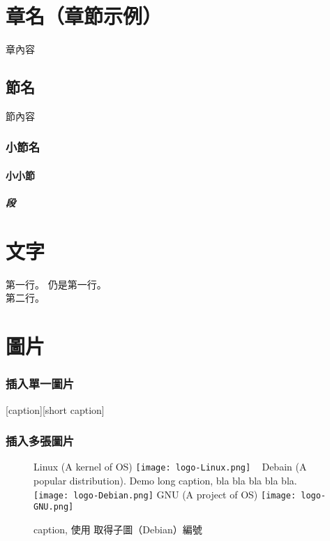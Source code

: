 \documentclass[class=NCU_thesis, crop=false]{standalone}
\begin{document}
\chapter{章名（章節示例）}
章內容
\section{節名}
節內容
\subsection{小節名}
 \subsubsection{小小節}
 \paragraph{段}


\chapter{文字}
第一行。
仍是第一行。 \\
第二行。


\chapter{圖片}
\subsection{插入單一圖片}
[caption][short caption]

\subsection{插入多張圖片}
\begin{figure}[!hbt]
    \centering
    \subcaptionbox
        {Linux (A kernel of OS)
        \label{fig:subfig_linux}}
        {\texttt{[image: logo-Linux.png]}}
    ~
    \subcaptionbox
        {Debain (A popular distribution). Demo long caption,  bla bla bla bla bla.
        \label{fig:subfig_debian}}
        {\texttt{[image: logo-Debian.png]}}
    \vspace{\baselineskip} %
    \subcaptionbox
        {GNU (A project of OS)
        \label{fig:subfig_gnu}}
        {\texttt{[image: logo-GNU.png]}}
    \caption{caption, 使用 取得子圖（Debian）編號 }
    \label{fig:labal}
\end{figure}
\end{document}

